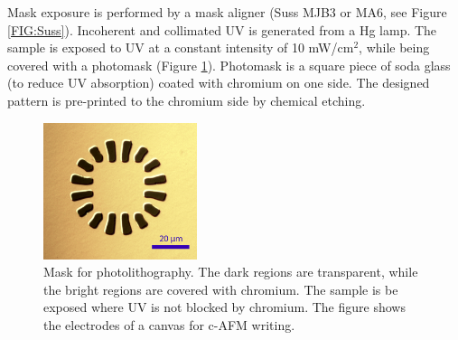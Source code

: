 \documentclass[pdflatex, sectionletters, 12pt, final, phd]{pittetd}    %
\begin{document}
Mask exposure is performed by a mask aligner (Suss MJB3 or MA6, see Figure \ref{FIG:Suss}). Incoherent and collimated UV is generated from a Hg lamp. The sample is exposed to UV at a constant intensity of 10 mW/cm$^2$, while being covered with a photomask (Figure \ref{FIG:MASK}). Photomask is a square piece of soda glass (to reduce UV absorption) coated with chromium on one side. The designed pattern is pre-printed to the chromium side by chemical etching.

\begin{figure}[h!]
	\centering
	\vspace{0.85cm}
	\includegraphics[width=0.4\textwidth]{Drawing/MASK.png}
	\caption[Mask for photolithography]{Mask for photolithography. The dark regions are transparent, while the bright regions are covered with chromium. The sample is be exposed where UV is not blocked by chromium. The figure shows the electrodes of a canvas for c-AFM writing.}
	\label{FIG:MASK}
\end{figure}
\end{document}
